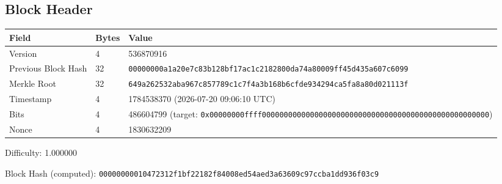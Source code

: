 \subsection*{Block Header}
\begin{tabular}{@{}lll@{}} \toprule
Field & Bytes & Value \\ \midrule
Version & 4 & 536870916 \\
Previous Block Hash & 32 & \texttt{00000000a1a20e7c83b128bf17ac1c2182800da74a80009ff45d435a607c6099} \\
Merkle Root & 32 & \texttt{649a262532aba967c857789c1c7f4a3b168b6cfde934294ca5fa8a80d021113f} \\
Timestamp & 4 & 1784538370 (2026-07-20 09:06:10 UTC) \\
Bits & 4 & 486604799 (target: \texttt{0x00000000ffff0000000000000000000000000000000000000000000000000000}) \\
Nonce & 4 & 1830632209 \\
\bottomrule \end{tabular}

Difficulty: 1.000000

Block Hash (computed): \texttt{00000000010472312f1bf22182f84008ed54aed3a63609c97ccba1dd936f03c9}
